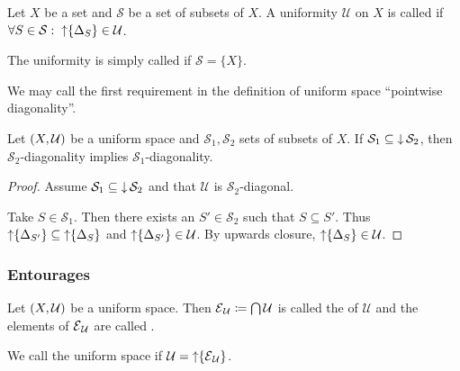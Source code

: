 \begin{definition}
Let $X$ be a set and $\mathcal{S}$ be a set of subsets of $X$. A uniformity $\mathcal{U}$ on $X$ is called  if $\forall S\in\mathcal{S}: \; \operatorname{\uparrow}\{\Delta_S\} \in \mathcal{U}$.

The uniformity is simply called  if $\mathcal{S} = \{X\}$.
\end{definition}
We may call the first requirement in the definition of uniform space ``pointwise diagonality''.

\begin{lemma}
Let $\sSet{X,\mathcal{U}}$ be a uniform space and $\mathcal{S}_1, \mathcal{S}_2$ sets of subsets of $X$. If $\mathcal{S}_1 \subseteq \operatorname{\downarrow} \mathcal{S}_2$, then $\mathcal{S}_2$-diagonality implies $\mathcal{S}_1$-diagonality.
\end{lemma}
\begin{proof}
Assume $\mathcal{S}_1 \subseteq \operatorname{\downarrow} \mathcal{S}_2$ and that $\mathcal{U}$ is $\mathcal{S}_2$-diagonal.

Take $S\in \mathcal{S}_1$. Then there exists an $S'\in \mathcal{S}_2$ such that $S\subseteq S'$. Thus $\operatorname{\uparrow}\{\Delta_{S'}\} \subseteq \operatorname{\uparrow}\{\Delta_{S}\}$ and $\operatorname{\uparrow}\{\Delta_{S'}\}\in \mathcal{U}$. By upwards closure, $\operatorname{\uparrow}\{\Delta_{S}\} \in \mathcal{U}$.
\end{proof}

\subsubsection{Entourages}
\begin{definition}
Let $\sSet{X, \mathcal{U}}$ be a uniform space. Then $\operatorname{\mathcal{E}}_\mathcal{U} \coloneqq \bigcap \mathcal{U}$ is called the  of $\mathcal{U}$ and the elements of $\operatorname{\mathcal{E}}_\mathcal{U}$ are called .

We call the uniform space  if $\mathcal{U} = \operatorname{\uparrow}\{\operatorname{\mathcal{E}}_\mathcal{U}\}$.
\end{definition}


